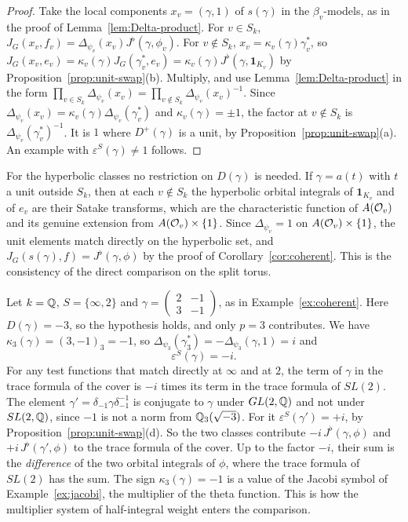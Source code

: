 \begin{proof}
Take the local components $x_v=(\gamma,1)$ of $s(\gamma)$ in the
$\beta_v$-models, as in the proof of Lemma~\ref{lem:Delta-product}. For
$v\in S_k$, $J_G(x_v,f_v)=\Delta_{\psi_v}(x_v)J^\flat(\gamma,\phi_v)$. For
$v\notin S_k$, $x_v=\kappa_v(\gamma)\gamma_v^*$, so
$J_G(x_v,e_v)=\kappa_v(\gamma)J_G(\gamma^*_v,e_v)=\kappa_v(\gamma)J^\flat(
\gamma,\mathbf 1_{K_v})$ by Proposition~\ref{prop:unit-swap}(b). Multiply,
and use Lemma~\ref{lem:Delta-product} in the form $\prod_{v\in S_k}
\Delta_{\psi_v}(x_v)=\prod_{v\notin S_k}\Delta_{\psi_v}(x_v)^{-1}$. Since
$\Delta_{\psi_v}(x_v)=\kappa_v(\gamma)\Delta_{\psi_v}(\gamma^*_v)$ and
$\kappa_v(\gamma)=\pm1$, the factor at $v\notin S_k$ is
$\Delta_{\psi_v}(\gamma_v^*)^{-1}$. It is $1$ where $D^+(\gamma)$ is a unit,
by Proposition~\ref{prop:unit-swap}(a). An example with
$\varepsilon^S(\gamma)\ne1$ follows.
\end{proof}

For the hyperbolic classes no restriction on $D(\gamma)$ is needed. If
$\gamma=a(t)$ with $t$ a unit outside $S_k$, then at each $v\notin S_k$
the hyperbolic orbital integrals of $\mathbf 1_{K_v}$ and of $e_v$ are
their Satake transforms, which are the characteristic function of
$A(\mathcal{O}_v)$ and its genuine extension from $A(\mathcal{O}_v)\times\{1\}$. Since
$\Delta_{\psi_v}=1$ on $A(\mathcal{O}_v)\times\{1\}$, the unit elements match
directly on the hyperbolic set, and $J_G(s(\gamma),f)=J^\flat(\gamma,\phi)$
by the proof of Corollary~\ref{cor:coherent}. This is the consistency of
the direct comparison on the split torus.

\begin{example}\label{ex:epsilon}
Let $k=\mathbb{Q}$, $S=\{\infty,2\}$ and $\gamma=\begin{pmatrix}2&-1\\3&-1
\end{pmatrix}$, as in Example~\ref{ex:coherent}. Here $D(\gamma)=-3$, so
the hypothesis holds, and only $p=3$ contributes. We have
$\kappa_3(\gamma)=(3,-1)_3=-1$, so
$\Delta_{\psi_3}(\gamma_3^*)=-\Delta_{\psi_3}(\gamma,1)=i$ and
\[
\varepsilon^S(\gamma)=-i .
\]
For any test functions that match directly at $\infty$ and at $2$, the
term of $\gamma$ in the trace formula of the cover is $-i$ times its
term in the trace formula of $SL(2)$. The element
$\gamma'=\delta_{-1}\gamma\delta_{-1}^{-1}$ is conjugate to $\gamma$
under $GL(2,\mathbb{Q})$ and not under $SL(2,\mathbb{Q})$, since $-1$ is not a norm from
$\mathbb{Q}_3(\sqrt{-3})$. For it $\varepsilon^S(\gamma')=+i$, by
Proposition~\ref{prop:unit-swap}(d). So the two classes contribute
$-i\,J^\flat(\gamma,\phi)$ and $+i\,J^\flat(\gamma',\phi)$ to the trace
formula of the cover. Up to the factor $-i$, their sum is the
\emph{difference} of the two orbital integrals of $\phi$, where the trace
formula of $SL(2)$ has the sum. The sign
$\kappa_3(\gamma)=-1$ is a value of the Jacobi symbol of
Example~\ref{ex:jacobi}, the multiplier of the theta function. This is
how the multiplier system of half-integral weight enters the comparison.
\end{example}

